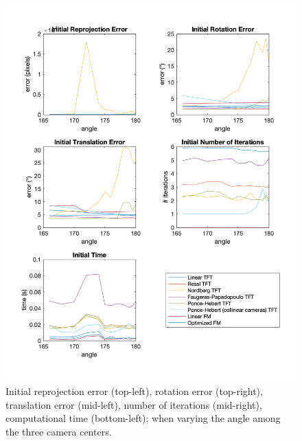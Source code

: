 \begin{figure}[p]
	\centering
	\includegraphics[width=1\textwidth]{Experiments/Synthetic/angle/INITanglePlots.png}
	\caption[Synthetic Trial varying Camera Centers Angle]{Initial reprojection error (top-left), rotation error (top-right), translation error (mid-left), number of iterations (mid-right), computational time (bottom-left); when varying the angle among the three camera centers.}
	\label{fig:initAnglePlot}
\end{figure}

